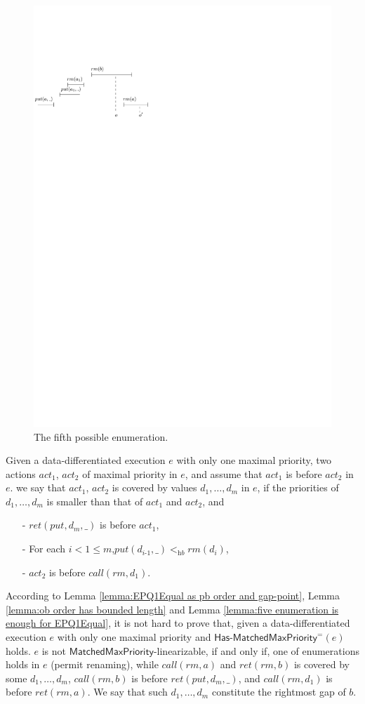 \begin{figure}[htbp]
  \centering
  \includegraphics[width=0.4 \textwidth]{figures/PIC-HIS-PQ1Equal-5.pdf}
  \caption{The fifth possible enumeration.}
  \label{fig:history enumeration 5 for PQ1Equal}
\end{figure}

Given a data-differentiated execution $e$ with only one maximal priority, two actions $\textit{act}_1$, $\textit{act}_2$ of maximal priority in $e$, and assume that $\textit{act}_1$ is before $\textit{act}_2$ in $e$.
we say that $\textit{act}_1$, $\textit{act}_2$ is covered by values $d_1,\ldots,d_m$ in $e$, if the priorities of $d_1,\ldots,d_m$ is smaller than that of $\textit{act}_1$ and $\textit{act}_2$, and

\begin{itemize}
\setlength{\itemsep}{0.5pt}
\item[-] $\textit{ret}(\textit{put},d_m,\_)$ is before $\textit{act}_1$,

\item[-] For each $i < 1 \leq m$,$\textit{put}(d_{\textit{i-1}},\_) <_{\textit{hb}} \textit{rm}(d_i)$,

\item[-] $\textit{act}_2$ is before $\textit{call}(\textit{rm},d_1)$.
\end{itemize}

According to Lemma \ref{lemma:EPQ1Equal as pb order and gap-point}, Lemma \ref{lemma:ob order has bounded length} and Lemma \ref{lemma:five enumeration is enough for EPQ1Equal}, it is not hard to prove that, given a data-differentiated execution $e$ with only one maximal priority and $\mathsf{Has\text{-}MatchedMaxPriority}^{=}(e)$ holds. $e$ is not $\mathsf{MatchedMaxPriority}$-linearizable, if and only if, one of enumerations holds in $e$ (permit renaming), while $\textit{call}(\textit{rm},a)$ and $\textit{ret}(\textit{rm},b)$ is covered by some $d_1,\ldots,d_m$, $\textit{call}(\textit{rm},b)$ is before $\textit{ret}(\textit{put},d_m,\_)$, and $\textit{call}(\textit{rm},d_1)$ is before $\textit{ret}(\textit{rm},a)$. We say that such $d_1,\ldots,d_m$ constitute the rightmost gap of $b$.


